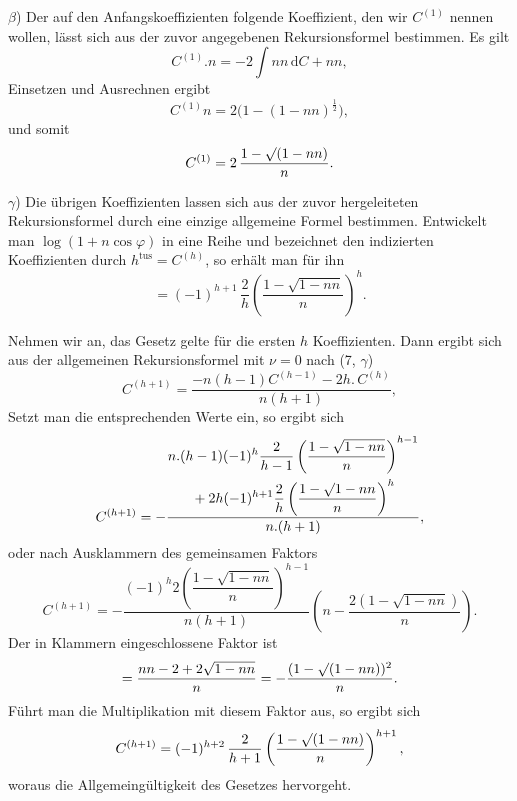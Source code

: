 $\beta$) Der auf den Anfangskoeffizienten folgende Koeffizient, den wir $C^{(1)}$ nennen wollen, lässt sich aus der zuvor
angegebenen Rekursionsformel bestimmen. Es gilt
\[
C^{(1)} .  n = -2\int nn\,\mathrm{d}C + nn,
\]
Einsetzen und Ausrechnen ergibt
\[
C^{(1)}n = 2\bigl(1-(1-nn)^{\frac{1}{2}}\bigr),
\]
und somit
\[
C^{(1)} = 2\,\frac{1-\mathord{\surd}(1-nn)}{n}.
\]
\par\noindent\hspace*{\parindent}$\gamma$) Die übrigen Koeffizienten lassen sich aus der zuvor hergeleiteten Rekursionsformel durch eine einzige allgemeine
Formel bestimmen. Entwickelt man $\log(1+n\cos\varphi)$ in eine Reihe und bezeichnet den indizierten
Koeffizienten durch $h^{\mathrm{tus}} = C^{(h)}$, so erhält man für ihn
\[
= (-1)^{h+1}\,\frac{2}{h}\left(\frac{1-\sqrt{1-nn}}{n}\right)^{h}.
\]
\par\noindent\hspace*{\parindent}Nehmen wir an, das Gesetz gelte für die ersten $h$ Koeffizienten. Dann ergibt sich aus der allgemeinen Rekursionsformel mit $\nu=0$ nach (7, $\gamma$)
\[
C^{(h+1)} = \frac{-n(h-1)C^{(h-1)}-2h.\,C^{(h)}}{n(h+1)}, 
\]
Setzt man die entsprechenden Werte ein, so ergibt sich
\[
C^{(h+1)} = -\frac{\begin{gathered}n.(h-1)(-1)^{h}\dfrac{2}{h-1}\left(\dfrac{1-\sqrt{1-nn}}{n}\right)^{h-1}\\{}+2h(-1)^{h+1}\dfrac{2}{h}\left(\dfrac{1-\mathord{\surd}1-nn}{n}\right)^{h}\end{gathered}}{n.(h+1)},
\]
oder nach Ausklammern des gemeinsamen Faktors
\[
C^{(h+1)} = -\frac{(-1)^{h}2\left(\dfrac{1-\sqrt{1-nn}}{n}\right)^{h-1}}{n(h+1)}\left(n-\frac{2(1-\sqrt{1-nn})}{n}\right).
\]
Der in Klammern eingeschlossene Faktor ist
\[
= \frac{nn-2+2\sqrt{1-nn}}{n} = -\frac{(1-\mathord{\surd}(1-nn))^{2}}{n}.
\]
Führt man die Multiplikation mit diesem Faktor aus, so ergibt sich
\[
C^{(h+1)} = (-1)^{h+2}\,\frac{2}{h+1}\left(\frac{1-\mathord{\surd}(1-nn)}{n}\right)^{h+1},
\]
woraus die Allgemeingültigkeit des Gesetzes hervorgeht.

